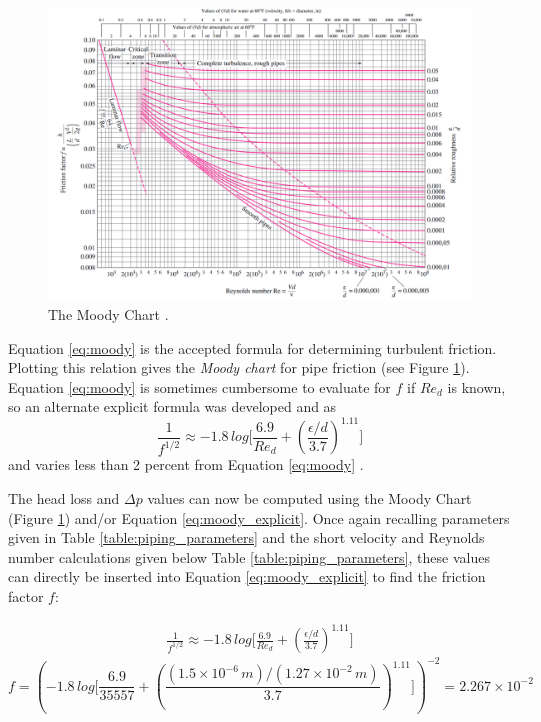 \documentclass[9pt]{article} %
\numberwithin{equation}{section} %
\begin{document}
\begin{figure}[!htb]
\centering
\includegraphics[scale=0.55]{moody_chart.PNG}
\caption{The Moody Chart \cite{fluid_mechanics}.}
\label{fig:moody_chart}
\end{figure}

Equation \ref{eq:moody} is the accepted formula for determining turbulent friction. Plotting this relation gives the \textit{Moody chart} for pipe friction (see Figure \ref{fig:moody_chart}). Equation \ref{eq:moody} is sometimes cumbersome to evaluate for $f$ if $Re_{d}$ is known, so an alternate explicit formula was developed and as
\begin{equation} \label{eq:moody_explicit}
\frac{1}{f^{1/2}} \approx -1.8\, log \Big[ \frac{6.9}{Re_{d}} + \left( \frac{\epsilon / d}{3.7} \right)^{1.11} \Big]
\end{equation}
and varies less than 2 percent from Equation \ref{eq:moody} \cite{fluid-mechanics}.

The head loss and $\Delta p$ values can now be computed using the Moody Chart (Figure \ref{fig:moody_chart}) and/or Equation \ref{eq:moody_explicit}. Once again recalling parameters given in Table \ref{table:piping_parameters} and the short velocity and Reynolds number calculations given below Table \ref{table:piping_parameters}, these values can directly be inserted into Equation \ref{eq:moody_explicit} to find the friction factor $f$:

\begin{align*}
\frac{1}{f^{1/2}} \approx -1.8\, log \Big[ \frac{6.9}{Re_{d}} + \left( \frac{\epsilon / d}{3.7} \right)^{1.11} \Big]
\end{align*}
\begin{equation}
f = \left( -1.8\, log \Bigg[ \frac{6.9}{35557} + \left( \frac{(1.5 \times 10^{-6}\, m)/(1.27 \times 10^{-2}\, m)}{3.7} \right) ^{1.11} \Bigg] \right)^{-2} = 2.267 \times 10^{-2}
\end{equation}
\end{document}
